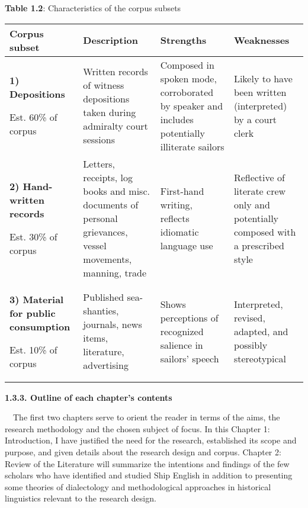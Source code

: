 \begin{styleNormali}
\textbf{Table 1.2}: Characteristics of the corpus subsets 
\end{styleNormali}


\begin{flushleft}
\tablehead{}
\begin{supertabular}{m{1.2851598in}m{1.4052598in}m{1.5948598in}m{1.2983599in}}
\hline
\textbf{Corpus subset} &
\textbf{Description} &
\textbf{Strengths} &
\textbf{Weaknesses}\\\hline
\textbf{1) Depositions}

Est. 60\% of corpus &
Written records of witness depositions taken during admiralty court sessions &
Composed in spoken mode, corroborated by speaker and includes potentially illiterate sailors &
Likely to have been written (interpreted) by a court clerk\\\hline
\textbf{2) Hand-written records}

Est. 30\% of corpus &
Letters, receipts, log books and misc. documents of personal grievances, vessel movements, manning, trade  &
First-hand writing, reflects idiomatic language use  &
Reflective of literate crew only and potentially composed with a prescribed style\\\hline
\textbf{3) Material for public consumption}

Est. 10\% of corpus &
Published sea-shanties, journals, news items, literature, advertising  &
Shows perceptions of recognized salience in sailors’ speech  &
Interpreted, revised, adapted, and possibly stereotypical \\\hline
\end{supertabular}
\end{flushleft}
\begin{styleNormali}
\textbf{1.3.3. Outline of each chapter’s contents}
\end{styleNormali}


\begin{styleNormali}
\ \ The first two chapters serve to orient the reader in terms of the aims, the research methodology and the chosen subject of focus. In this Chapter 1: Introduction, I have justified the need for the research, established its scope and purpose, and given details about the research design and corpus. Chapter 2: Review of the Literature will summarize the intentions and findings of the few scholars who have identified and studied Ship English in addition to presenting some theories of dialectology and methodological approaches in historical linguistics relevant to the research design. 
\end{styleNormali}


